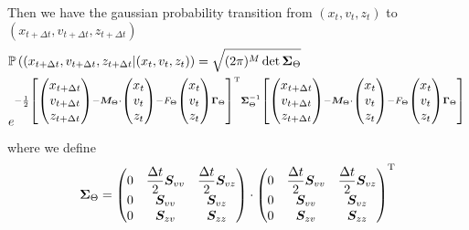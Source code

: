 \documentclass{article}
\numberwithin{equation}{section} %
\newcommand{\f}[2]{\mathchoice%
			{\dfrac{#1}{#2}}
	    	{\dfrac{#1}{#2}}
			{\frac{#1}{#2}}
			{\frac{#1}{#2}}}
\newcommand{\prob}[1]{\ensuremath{\mathbb{P}\left(#1\right)}}
\renewcommand{\rm}[1]{\mathrm{#1}}%
\newcommand{\T}{\rm{T}}
\newcommand{\1}{\mathds{1}} %
\begin{document}
Then we have the gaussian probability transition from $(x_t,v_t,z_t)$ to $(x_{t+\Delta t},v_{t+\Delta t},z_{t+\Delta t})$
\begin{align}
    \label{eq:probaTransition}
   & \prob{(x_{t+\Delta t},v_{t+\Delta t},z_{t+\Delta t} | (x_t,v_t,z_t) } =  \sqrt{(2\pi)^M\det \bm{\Sigma}_{\Theta} }\\ \nonumber& e^{-\f{1}{2}\left[\begin{pmatrix}
    x_{t+\Delta t} \\ v_{t+\Delta t} \\ z_{t+\Delta t}
    \end{pmatrix}-\bm{M}_{\Theta}\cdot\begin{pmatrix}
    x_t \\ v_t \\ z_t
    \end{pmatrix} - F_{\Theta}\begin{pmatrix}
    x_t \\ v_t \\ z_t
    \end{pmatrix} \bm{\Gamma}_{\Theta}\right]^\T\bm{\Sigma}_{\Theta}^{-1}\left[ \begin{pmatrix}
    x_{t+\Delta t} \\ v_{t+\Delta t} \\ z_{t+\Delta t}
    \end{pmatrix}-\bm{M}_{\Theta}\cdot\begin{pmatrix}
    x_t \\ v_t \\ z_t
    \end{pmatrix} - F_{\Theta}\begin{pmatrix}
    x_t \\ v_t \\ z_t
    \end{pmatrix} \bm{\Gamma}_{\Theta}\right]}
\end{align}
where we define
\begin{equation}
    \label{eq:covariance_trans_gauss}
   \bm{\Sigma}_{\Theta} = 
   \begin{pmatrix}
    0 & \f{\Delta t}{2} \bm{S}_{vv} &  \f{\Delta t}{2} \bm{S}_{vz}\\
    0 & \bm{S}_{vv} & \bm{S}_{vz} \\
    0 & \bm{S}_{zv} & \bm{S}_{zz}
    \end{pmatrix} \cdot \begin{pmatrix}
    0 & \f{\Delta t}{2} \bm{S}_{vv} &  \f{\Delta t}{2} \bm{S}_{vz}\\
    0 & \bm{S}_{vv} & \bm{S}_{vz} \\
    0 & \bm{S}_{zv} & \bm{S}_{zz}
    \end{pmatrix}^\T
\end{equation}
\end{document}
